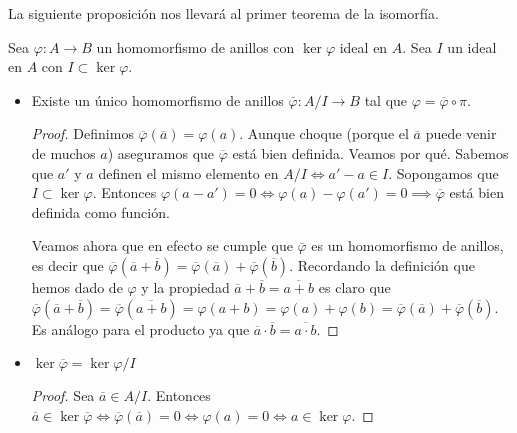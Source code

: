 La siguiente proposición nos llevará al primer teorema de la isomorfía.
\begin{pro}
	Sea $\varphi: A \to B$ un homomorfismo de anillos con $\ker \varphi$ ideal en $A$. Sea $I$ un ideal en $A$ con $I \subset \ker \varphi$.
	\begin{itemize}
		\item Existe un único homomorfismo de anillos $\overline{\varphi}: A / I \to B$ tal que $\varphi = \overline{\varphi} \circ \pi$.
		\begin{figure}[h]
			\centering
		\end{figure}
		\begin{proof}
			Definimos $\overline{\varphi}(\overline{a}) = \varphi(a)$. Aunque choque (porque el $\overline{a}$ puede venir de muchos $a$) aseguramos que $\overline{\varphi}$ está bien definida. Veamos por qué. Sabemos que $a'$ y $a$ definen el mismo elemento en $A / I \iff a' - a \in I$. Sopongamos que $I \subset \ker \varphi$. Entonces $\varphi(a - a') = 0 \iff \varphi(a) - \varphi(a') = 0 \implies \overline{\varphi}$ está bien definida como función.
			
			Veamos ahora que en efecto se cumple que $\overline{\varphi}$ es un homomorfismo de anillos, es decir que $\overline{\varphi}(\overline{a} + \overline{b}) = \overline{\varphi}(\overline{a}) + \overline{\varphi}(\overline{b})$. Recordando la definición que hemos dado de $\varphi$ y la propiedad $\overline{a} + \overline{b} = \overline{a + b}$ es claro que $\overline{\varphi}(\overline{a} + \overline{b}) = \overline{\varphi}(\overline{a +b}) = \varphi(a + b) = \varphi(a) + \varphi(b) = \overline{\varphi}(\overline{a}) + \overline{\varphi}(\overline{b})$. Es análogo para el producto ya que $\overline{a} \cdot \overline{b} = \overline{a \cdot b}$.
		\end{proof}
		\item $\ker \overline{\varphi} = \ker \varphi / I$
		\begin{proof}
			Sea $\overline{a} \in A / I$. Entonces $\overline{a} \in \ker \overline{\varphi} \iff \overline{\varphi}(\overline{a}) = 0 \iff \varphi(a) = 0 \iff a \in \ker \varphi$.
		\end{proof}
	\end{itemize}
\end{pro}

